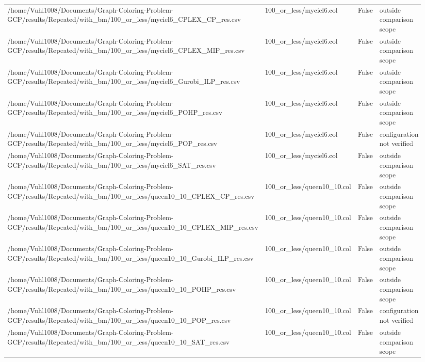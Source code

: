 \begin{table}[htbp]
\begin{tabular}{llll}
/home/Vuhl1008/Documents/Graph-Coloring-Problem-GCP/results/Repeated/with\_bm/100\_or\_less/myciel6\_CPLEX\_CP\_res.csv & 100\_or\_less/myciel6.col & False & outside comparison scope \\
/home/Vuhl1008/Documents/Graph-Coloring-Problem-GCP/results/Repeated/with\_bm/100\_or\_less/myciel6\_CPLEX\_MIP\_res.csv & 100\_or\_less/myciel6.col & False & outside comparison scope \\
/home/Vuhl1008/Documents/Graph-Coloring-Problem-GCP/results/Repeated/with\_bm/100\_or\_less/myciel6\_Gurobi\_ILP\_res.csv & 100\_or\_less/myciel6.col & False & outside comparison scope \\
/home/Vuhl1008/Documents/Graph-Coloring-Problem-GCP/results/Repeated/with\_bm/100\_or\_less/myciel6\_POHP\_res.csv & 100\_or\_less/myciel6.col & False & outside comparison scope \\
/home/Vuhl1008/Documents/Graph-Coloring-Problem-GCP/results/Repeated/with\_bm/100\_or\_less/myciel6\_POP\_res.csv & 100\_or\_less/myciel6.col & False & configuration not verified \\
/home/Vuhl1008/Documents/Graph-Coloring-Problem-GCP/results/Repeated/with\_bm/100\_or\_less/myciel6\_SAT\_res.csv & 100\_or\_less/myciel6.col & False & outside comparison scope \\
/home/Vuhl1008/Documents/Graph-Coloring-Problem-GCP/results/Repeated/with\_bm/100\_or\_less/queen10\_10\_CPLEX\_CP\_res.csv & 100\_or\_less/queen10\_10.col & False & outside comparison scope \\
/home/Vuhl1008/Documents/Graph-Coloring-Problem-GCP/results/Repeated/with\_bm/100\_or\_less/queen10\_10\_CPLEX\_MIP\_res.csv & 100\_or\_less/queen10\_10.col & False & outside comparison scope \\
/home/Vuhl1008/Documents/Graph-Coloring-Problem-GCP/results/Repeated/with\_bm/100\_or\_less/queen10\_10\_Gurobi\_ILP\_res.csv & 100\_or\_less/queen10\_10.col & False & outside comparison scope \\
/home/Vuhl1008/Documents/Graph-Coloring-Problem-GCP/results/Repeated/with\_bm/100\_or\_less/queen10\_10\_POHP\_res.csv & 100\_or\_less/queen10\_10.col & False & outside comparison scope \\
/home/Vuhl1008/Documents/Graph-Coloring-Problem-GCP/results/Repeated/with\_bm/100\_or\_less/queen10\_10\_POP\_res.csv & 100\_or\_less/queen10\_10.col & False & configuration not verified \\
/home/Vuhl1008/Documents/Graph-Coloring-Problem-GCP/results/Repeated/with\_bm/100\_or\_less/queen10\_10\_SAT\_res.csv & 100\_or\_less/queen10\_10.col & False & outside comparison scope \\

\end{tabular}
\end{table}
